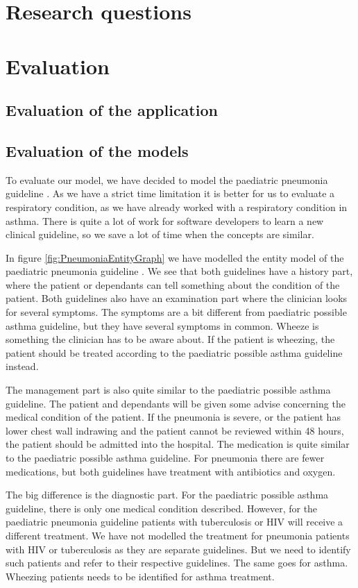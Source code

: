 \documentclass[a4paper,12pt]{book}
\begin{document}
\section{Research questions}
\section{Evaluation}
\subsection{Evaluation of the application}
\subsection{Evaluation of the models}
To evaluate our model, we have decided to model the paediatric pneumonia guideline \parencite{RepublicofKeny2016}. As we have a strict time limitation it is better for us to evaluate a respiratory condition, as we have already worked with a respiratory condition in asthma. There is quite a lot of work for software developers to learn a new clinical guideline, so we save a lot of time when the concepts are similar.

In figure \ref{fig:PneumoniaEntityGraph} we have modelled the entity model of the paediatric pneumonia guideline \parencite{RepublicofKeny2016}. We see that both guidelines have a history part, where the patient or dependants can tell something about the condition of the patient. Both guidelines also have an examination part where the clinician looks for several symptoms. The symptoms are a bit different from paediatric possible asthma guideline, but they have several symptoms in common. Wheeze is something the clinician has to be aware about. If the patient is wheezing, the patient should be treated according to the paediatric possible asthma guideline instead.

The management part is also quite similar to the paediatric possible asthma guideline. The patient and dependants will be given some advise concerning the medical condition of the patient. If the pneumonia is severe, or the patient has lower chest wall indrawing and the patient cannot be reviewed within 48 hours, the patient should be admitted into the hospital. The medication is quite similar to the paediatric possible asthma guideline. For pneumonia there are fewer medications, but both guidelines have treatment with antibiotics and oxygen.

The big difference is the diagnostic part. For the paediatric possible asthma guideline, there is only one medical condition described. However, for the paediatric pneumonia guideline patients with tuberculosis or HIV will receive a different treatment. We have not modelled the treatment for pneumonia patients with HIV or tuberculosis as they are separate guidelines. But we need to identify such patients and refer to their respective guidelines. The same goes for asthma. Wheezing patients needs to be identified for asthma treatment.
\end{document}
